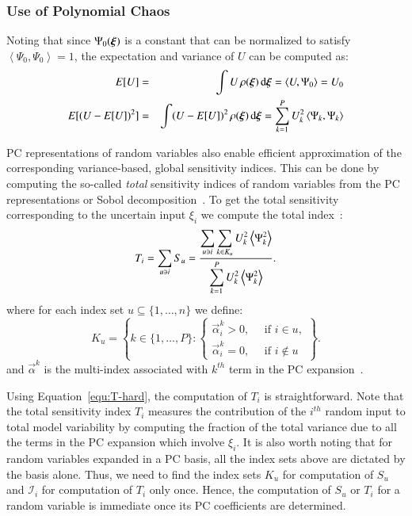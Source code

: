 \subsubsection{Use of Polynomial Chaos}
Noting that since $\Psi_0(\xxi)$ is a constant that can be normalized to satisfy 
$\left<\Psi_0,\Psi_0\right>=1$, the expectation and variance of $U$ can be computed as:
\begin{eqnarray}
 E[U]&=&\int U \, \rho(\xxi) \, \mbox{d}\xxi=\left< U,\Psi_0\right> = U_0  
 \label{eq:mean} \\
 E[(U-E[U])^2]&=&\int (U-E[U])^2 \, \rho(\xxi) \, \mbox{d}\xxi=\sum_{k=1}^P U_k^2
 \label{eq:sigma}
\left<\Psi_k,\Psi_k\right>
\end{eqnarray}

PC representations of random variables also enable efficient
approximation of the corresponding variance-based, global
sensitivity indices. This can be done by computing the so-called {\it total} 
sensitivity indices of random variables from the PC representations or Sobol decomposition~\citep{Sobol:1993,Homma:1996,Sobol:2001}. To get the total sensitivity corresponding to the uncertain
input $\xi_i$ we compute the total index~\citep{LeMaitreKnio2010,Crestaux,Sudret}:
\begin{equation} \label{equ:T-hard}
   T_i = \displaystyle \sum_{u \ni i} S_u =
         \frac{\displaystyle
              \sum_{u \ni i} \sum_{k \in K_u} U_k^2 \left\langle {\Psi_k^2} \right\rangle}
              {\displaystyle\sum_{k = 1}^P U_k^2 \left\langle {\Psi_k^2} \right\rangle} .
\end{equation}
where for each index set $u \subseteq \{1, \ldots, n\}$ we define:
\[
   K_u = \left\{ k \in \{1, \ldots, P\} :
          \begin{cases}
           \vec{\alpha}^k_i > 0, \quad \mbox{ if } i \in u,\\
           \vec{\alpha}^k_i = 0, \quad \mbox{ if } i \notin u
          \end{cases}\right\}.
        \]
        and $\vec{\alpha}^k$ is the
multi-index associated with $k^{th}$ term in the
PC expansion~\cite{LeMaitreKnio2010}.

Using Equation~\eqref{equ:T-hard}, the computation of $T_i$ is straightforward.
Note that the total sensitivity index $T_i$ measures the contribution of
the $i^{th}$ random input to total model variability by
computing the fraction of the total variance due to all the terms in the
PC expansion which involve $\xi_i$. It is also worth noting that for random variables expanded in a PC basis, all the index sets
above are dictated by the basis alone. Thus, we need to find the index sets $K_u$
for computation of $S_u$ and $\mathcal{I}_i$ for computation
of $T_i$ only once. Hence, the computation of $S_u$ or $T_i$ for a
random variable is immediate once its PC coefficients are determined.


